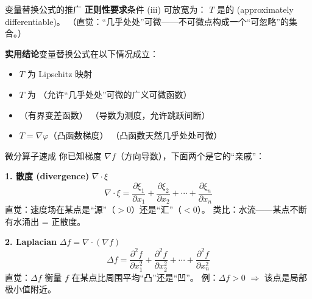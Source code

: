 \documentclass[aspectratio=169,10pt]{beamer}
\begin{document}
\begin{frame}{变量替换公式的推广}
  \textbf{正则性要求}\enspace 条件 (iii) 可放宽为：
  $T$ 是的 (approximately differentiable)。
  \;（直觉：``几乎处处''可微——不可微点构成一个``可忽略''的集合。）

  \medskip
  \textbf{实用结论}\enspace 变量替换公式在以下情况成立：
  \begin{itemize}
    \item[\textcolor{TLpos}{\ding{51}}] $T$ 为 Lipschitz 映射
    \item[\textcolor{TLpos}{\ding{51}}] $T$ 为
      \;（允许``几乎处处''可微的广义可微函数）
    \item[\textcolor{TLpos}{\ding{51}}] （有界变差函数）
      \;（导数为测度，允许跳跃间断）
    \item[\textcolor{TLpos}{\ding{51}}] $T=\nabla\varphi$（凸函数梯度）
      \;（凸函数天然几乎处处可微）
  \end{itemize}
\end{frame}

\begin{frame}{微分算子速成}
  你已知梯度 $\nabla f$（方向导数），下面两个是它的``亲戚''：

  \vspace{0.5em}
  \textbf{1. 散度 (divergence)} $\nabla\cdot\xi$
  \[
    \nabla\cdot\xi = \frac{\partial\xi_1}{\partial x_1}
      + \frac{\partial\xi_2}{\partial x_2} + \cdots
      + \frac{\partial\xi_n}{\partial x_n}
  \]
  {\small 直觉：速度场在某点是``源''（$>0$）还是``汇''（$<0$）。\quad
    类比：水流——某点不断有水涌出 = 正散度。}

  \vspace{0.8em}
  \textbf{2. Laplacian} $\Delta f = \nabla\cdot(\nabla f)$
  \[
    \Delta f = \frac{\partial^2 f}{\partial x_1^2}
      + \frac{\partial^2 f}{\partial x_2^2} + \cdots
      + \frac{\partial^2 f}{\partial x_n^2}
  \]
  {\small 直觉：$\Delta f$ 衡量 $f$ 在某点比周围平均``凸''还是``凹''。\quad
    例：$\Delta f>0$ $\Rightarrow$ 该点是局部极小值附近。}
\end{frame}
\end{document}
